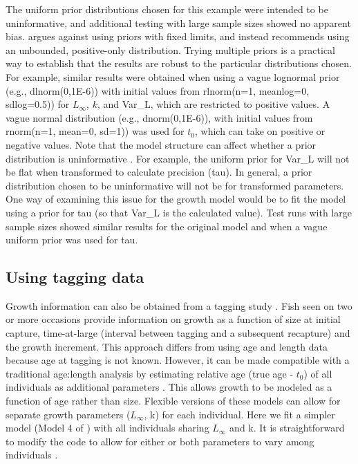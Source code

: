 \documentclass[
]{krantz}
\begin{document}
The uniform prior distributions chosen for this example were intended to be uninformative, and additional testing with large sample sizes showed no apparent bias. \citet{lemoine_2019} argues against using priors with fixed limits, and instead recommends using an unbounded, positive-only distribution. Trying multiple priors is a practical way to establish that the results are robust to the particular distributions chosen. For example, similar results were obtained when using a vague lognormal prior (e.g., dlnorm(0,1E-6)) with initial values from rlnorm(n=1, meanlog=0, sdlog=0.5)) for \(L_\infty\), \(k\), and Var\_L, which are restricted to positive values. A vague normal distribution (e.g., dnorm(0,1E-6)), with initial values from rnorm(n=1, mean=0, sd=1)) was used for \(t_0\), which can take on positive or negative values. Note that the model structure can affect whether a prior distribution is uninformative \citep{mccarthy2007}. For example, the uniform prior for Var\_L will not be flat when transformed to calculate precision (tau). In general, a prior distribution chosen to be uninformative will not be for transformed parameters. One way of examining this issue for the growth model would be to fit the model using a prior for tau (so that Var\_L is the calculated value). Test runs with large sample sizes showed similar results for the original model and when a vague uniform prior was used for tau.

\hypertarget{GrowthInc}{%
\subsection{Using tagging data}\label{GrowthInc}}

Growth information can also be obtained from a tagging study \citep{wang.etal1995, zhang.etal2009, scherrer.etal2021}. Fish seen on two or more occasions provide information on growth as a function of size at initial capture, time-at-large (interval between tagging and a subsequent recapture) and the growth increment. This approach differs from using age and length data because age at tagging is not known. However, it can be made compatible with a traditional age:length analysis by estimating relative age (true age - \(t_0\)) of all individuals as additional parameters \citep{wang.etal1995, zhang.etal2009, scherrer.etal2021}. This allows growth to be modeled as a function of age rather than size. Flexible versions of these models can allow for separate growth parameters (\(L_\infty\), k) for each individual. Here we fit a simpler model (Model 4 of \citet{scherrer.etal2021}) with all individuals sharing \(L_\infty\) and k. It is straightforward to modify the code to allow for either or both parameters to vary among individuals \citep{scherrer.etal2021}.
\end{document}

